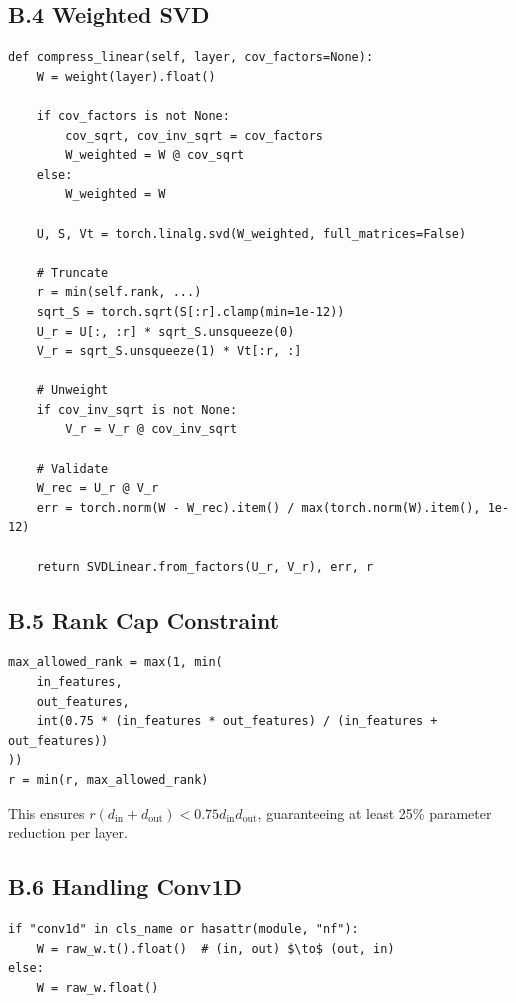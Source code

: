 \subsection{B.4 Weighted SVD}

\begin{lstlisting}
def compress_linear(self, layer, cov_factors=None):
    W = weight(layer).float()
    
    if cov_factors is not None:
        cov_sqrt, cov_inv_sqrt = cov_factors
        W_weighted = W @ cov_sqrt
    else:
        W_weighted = W
    
    U, S, Vt = torch.linalg.svd(W_weighted, full_matrices=False)
    
    # Truncate
    r = min(self.rank, ...)
    sqrt_S = torch.sqrt(S[:r].clamp(min=1e-12))
    U_r = U[:, :r] * sqrt_S.unsqueeze(0)
    V_r = sqrt_S.unsqueeze(1) * Vt[:r, :]
    
    # Unweight
    if cov_inv_sqrt is not None:
        V_r = V_r @ cov_inv_sqrt
    
    # Validate
    W_rec = U_r @ V_r
    err = torch.norm(W - W_rec).item() / max(torch.norm(W).item(), 1e-12)
    
    return SVDLinear.from_factors(U_r, V_r), err, r
\end{lstlisting}

\subsection{B.5 Rank Cap Constraint}

\begin{lstlisting}
max_allowed_rank = max(1, min(
    in_features,
    out_features,
    int(0.75 * (in_features * out_features) / (in_features + out_features))
))
r = min(r, max_allowed_rank)
\end{lstlisting}

This ensures $r(d_\text{in} + d_\text{out}) < 0.75 d_\text{in} d_\text{out}$, 
guaranteeing at least 25\% parameter reduction per layer.

\subsection{B.6 Handling Conv1D}

\begin{lstlisting}
if "conv1d" in cls_name or hasattr(module, "nf"):
    W = raw_w.t().float()  # (in, out) $\to$ (out, in)
else:
    W = raw_w.float()
\end{lstlisting}


